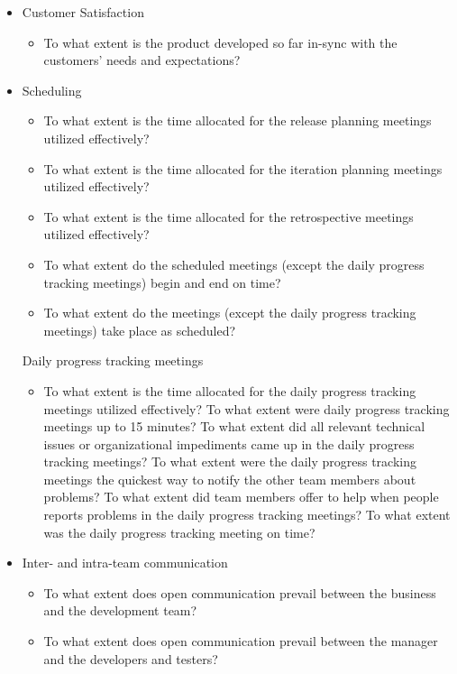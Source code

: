 \begin{appendices}
\begin{itemize}
\begin{itemize}
			\item Customer Satisfaction
				\begin{itemize}
					\item To what extent is the product developed so far in-sync with the customers' needs and expectations?
				\end{itemize}
			\item Scheduling
				\begin{itemize}
					\item To what extent is the time allocated for the release planning meetings utilized effectively? 
					\item To what extent is the time allocated for the iteration planning meetings utilized effectively?
					\item To what extent is the time allocated for the retrospective meetings utilized effectively? 
					\item To what extent do the scheduled meetings (except the daily progress tracking meetings) begin and end on time? 
					\item To what extent do the meetings (except the daily progress tracking meetings) take place as scheduled? 
				\end{itemize}
			\addition Daily progress tracking meetings
				\begin{itemize}
					\item To what extent is the time allocated for the daily progress tracking meetings utilized effectively? 
					\addition To what extent were daily progress tracking meetings up to 15 minutes?
					\addition To what extent did all relevant technical issues or organizational impediments came up in the daily progress tracking meetings?
					\addition To what extent were the daily progress tracking meetings the quickest way to notify the other team members about problems?
					\addition To what extent did team members offer to help when people reports problems in the daily progress tracking meetings?
					\addition To what extent was the daily progress tracking meeting on time?
				\end{itemize}
			\item Inter- and intra-team communication
				\begin{itemize}
					\item To what extent does open communication prevail between the business and the development team? 
					\item To what extent does open communication prevail between the manager and the developers and testers? 

\end{itemize}
\end{itemize}
\end{itemize}
\end{appendices}
